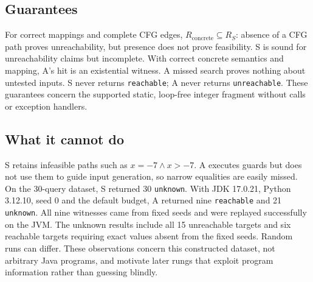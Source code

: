 \subsection{Guarantees}
For correct mappings and complete CFG edges,
$R_{\mathrm{concrete}} \subseteq R_S$: absence of a CFG path proves
unreachability, but presence does not prove feasibility. S is sound for
unreachability claims but incomplete. With correct concrete semantics and
mapping, A's hit is an existential witness. A missed search proves nothing
about untested inputs. S never returns \texttt{reachable}; A never returns
\texttt{unreachable}. These guarantees concern the supported static,
loop-free integer fragment without calls or exception handlers.

\subsection{What it cannot do}
S retains infeasible paths such as $x=-7 \land x>-7$. A executes guards but
does not use them to guide input generation, so narrow equalities are easily
missed. On the 30-query dataset, S returned 30 \texttt{unknown}. With JDK
17.0.21, Python 3.12.10, seed 0 and the default budget, A returned nine
\texttt{reachable} and 21 \texttt{unknown}. All nine witnesses came from fixed
seeds and were replayed successfully on the JVM. The unknown results include
all 15 unreachable targets and six reachable targets requiring exact values
absent from the fixed seeds. Random runs can differ. These observations concern
this constructed dataset, not arbitrary Java programs, and motivate later
rungs that exploit program information rather than guessing blindly.
